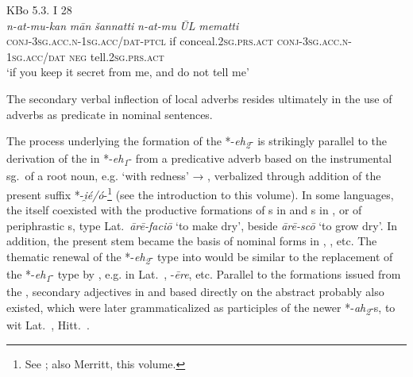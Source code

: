 \documentclass[output=paper,colorlinks,citecolor=brown]{langscibook}
\begin{document}
\begin{exe}
    \ex KBo 5.3. I 28\\ \gll \textit{n-at-mu-kan} \textit{mān} {\textit{šannatti} } \textit{n-at-mu} \textit{ŪL} \textit{mematti}\\
    \textsc{conj-3sg.acc.n-1sg.acc/dat-ptcl} if conceal.\textsc{2sg.prs.act} \textsc{conj-3sg.acc.n-1sg.acc/dat} \textsc{neg} tell.\textsc{2sg.prs.act} \\
    \glt `if you keep it secret from me, and do not tell me' \label{ex:10}
\end{exe}


The secondary verbal inflection of local adverbs resides ultimately in the use of adverbs as predicate in nominal sentences. 

The process underlying the formation of the *-\textit{eh\textsubscript{2}}- is strikingly parallel to the derivation of the  in *-\textit{eh\textsubscript{1}}- from a predicative adverb based on the instrumental sg.\ of a root noun, e.g.  ‘with redness’ →  , verbalized through addition of the present suffix   *-\textit{i̯é/ó}-\footnote{See \citealt[145--149]{Jasanoff2004}; also Merritt, this volume.} (see the introduction to this volume). In some languages, the  itself coexisted with the productive formations of s in  and s in , or of periphrastic s, type Lat.\ \textit{ārē-faciō}  ‘to make dry’, beside \textit{ārē-scō}  ‘to grow dry’. In addition, the  present stem became the basis of nominal forms in , , etc. The thematic renewal of the *-\textit{eh\textsubscript{2}}-  type into  would be similar to the replacement of the *-\textit{eh\textsubscript{1}}- type by , e.g. in Lat.\   , -\textit{ēre}, etc. Parallel to the formations issued from the , secondary adjectives in  and  based directly on the abstract probably also existed, which were later grammaticalized as participles of the newer *-\textit{ah\textsubscript{2}}-s, to wit Lat.\  , Hitt.\ .  
\end{document}
